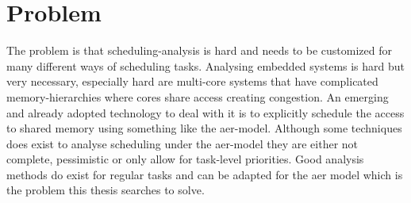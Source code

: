 \documentclass{kththesis}
\begin{document}















\section{Problem}

The problem is that scheduling-analysis is hard and needs to be customized for many different ways
of scheduling tasks. Analysing embedded systems is hard but very necessary, especially hard are
multi-core systems that have complicated memory-hierarchies where cores share access creating
congestion. An emerging and already adopted technology to deal with it is to explicitly schedule the
access to shared memory using something like the \acrshort{aer}-model. Although some techniques does
exist to analyse scheduling under the \acrshort{aer}-model they are either not complete,
pessimistic or only allow for task-level priorities. Good analysis methods do exist for regular
tasks and can be adapted for the \acrshort{aer} model which is the problem this thesis searches to
solve.
\end{document}
